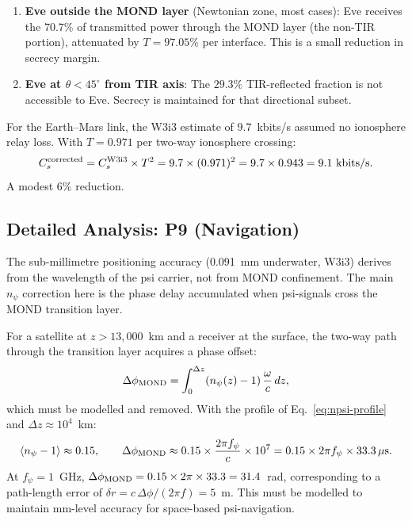 \documentclass[aps,prd,twocolumn,superscriptaddress]{revtex4-2}
\newcommand{\npsi}{n_\psi}
\begin{document}
\begin{enumerate}
  \item \textbf{Eve outside the MOND layer} (Newtonian zone, most cases):
    Eve receives the $70.7\%$ of transmitted power through the MOND
    layer (the non-TIR portion), attenuated by $T = 97.05\%$ per
    interface.  This is a small reduction in secrecy margin.
  \item \textbf{Eve at $\theta < 45^\circ$ from TIR axis}:
    The $29.3\%$ TIR-reflected fraction is not accessible to Eve.
    Secrecy is maintained for that directional subset.
\end{enumerate}

For the Earth--Mars link, the W3i3 estimate of 9.7~kbits/s assumed
no ionosphere relay loss.  With $T = 0.971$ per two-way ionosphere
crossing:
\begin{equation}
C_s^{\rm corrected} = C_s^{\rm W3i3} \times T^2 = 9.7 \times (0.971)^2
= 9.7 \times 0.943 = 9.1~\text{kbits/s}.
\end{equation}
A modest $6\%$ reduction.

\subsection{Detailed Analysis: P9 (Navigation)}
\label{subsec:P9}

The sub-millimetre positioning accuracy (0.091~mm underwater, W3i3)
derives from the wavelength of the psi carrier, not from MOND
confinement.  The main $\npsi$ correction here is the phase delay
accumulated when psi-signals cross the MOND transition layer.

For a satellite at $z > 13{,}000$~km and a receiver at the surface,
the two-way path through the transition layer acquires a phase offset:
\begin{equation}
\Delta\phi_{\rm MOND} = \int_0^{\Delta z} (\npsi(z) - 1)\,\frac{\omega}{c}\,dz,
\label{eq:phase-delay}
\end{equation}
which must be modelled and removed.  With the profile of
Eq.~\eqref{eq:npsi-profile} and $\Delta z \approx 10^4$~km:
\begin{equation}
\langle\npsi - 1\rangle \approx 0.15, \qquad
\Delta\phi_{\rm MOND} \approx 0.15 \times \frac{2\pi f_\psi}{c}\times10^7
= 0.15 \times 2\pi f_\psi \times 33.3\,\mu\text{s}.
\label{eq:phase-delay-numerical}
\end{equation}
At $f_\psi = 1$~GHz, $\Delta\phi_{\rm MOND} = 0.15 \times 2\pi \times 33.3 = 31.4$~rad,
corresponding to a path-length error of $\delta r = c\,\Delta\phi/(2\pi f) = 5$~m.
This must be modelled to maintain mm-level accuracy for space-based psi-navigation.
\end{document}
